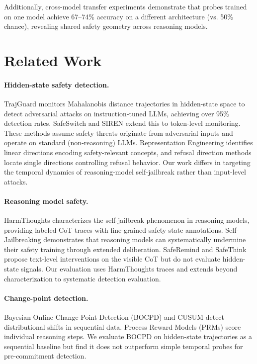 \documentclass[11pt,a4paper]{article}
\begin{document}
Additionally, cross-model transfer experiments demonstrate that probes trained on one model achieve 67--74\% accuracy on a different architecture (vs. 50\% chance), revealing shared safety geometry across reasoning models.

\section{Related Work}

\paragraph{Hidden-state safety detection.}
TrajGuard \cite{trajguard} monitors Mahalanobis distance trajectories in hidden-state space to detect adversarial attacks on instruction-tuned LLMs, achieving over 95\% detection rates. SafeSwitch \cite{safeswitch} and SIREN \cite{siren} extend this to token-level monitoring. These methods assume safety threats originate from adversarial inputs and operate on standard (non-reasoning) LLMs. Representation Engineering \cite{repe} identifies linear directions encoding safety-relevant concepts, and refusal direction methods \cite{refusal_direction} locate single directions controlling refusal behavior. Our work differs in targeting the temporal dynamics of reasoning-model self-jailbreak rather than input-level attacks.

\paragraph{Reasoning model safety.}
HarmThoughts \cite{harmthoughts} characterizes the self-jailbreak phenomenon in reasoning models, providing labeled CoT traces with fine-grained safety state annotations. Self-Jailbreaking \cite{selfjailbreak} demonstrates that reasoning models can systematically undermine their safety training through extended deliberation. SafeRemind \cite{saferemind} and SafeThink \cite{safethink} propose text-level interventions on the visible CoT but do not evaluate hidden-state signals. Our evaluation uses HarmThoughts traces and extends beyond characterization to systematic detection evaluation.

\paragraph{Change-point detection.}
Bayesian Online Change-Point Detection (BOCPD) \cite{bocpd} and CUSUM \cite{cusum} detect distributional shifts in sequential data. Process Reward Models (PRMs) \cite{prm} score individual reasoning steps. We evaluate BOCPD on hidden-state trajectories as a sequential baseline but find it does not outperform simple temporal probes for pre-commitment detection.
\end{document}
